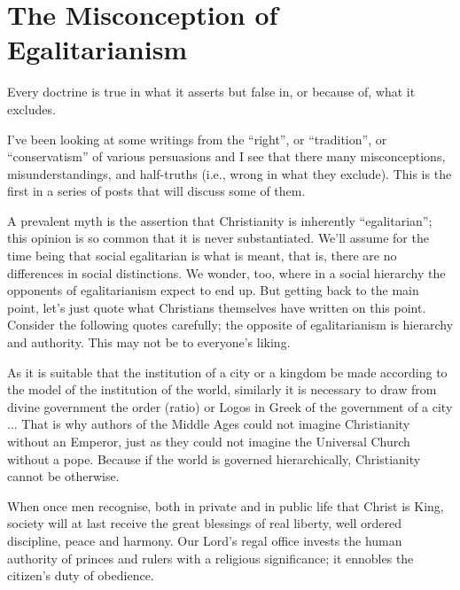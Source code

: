\section{The Misconception of Egalitarianism}

\begin{quotex}
Every doctrine is true in what it asserts but false in, or because of, what it excludes.
\end{quotex}


I've been looking at some writings from the ``right'', or ``tradition'', or ``conservatism'' of various persuasions and I see that there many misconceptions, misunderstandings, and half-truths (i.e., wrong in what they exclude). This is the first in a series of posts that will discuss some of them.

A prevalent myth is the assertion that Christianity is inherently ``egalitarian''; this opinion is so common that it is never substantiated. We'll assume for the time being that social egalitarian is what is meant, that is, there are no differences in social distinctions. We wonder, too, where in a social hierarchy the opponents of egalitarianism expect to end up. But getting back to the main point, let's just quote what Christians themselves have written on this point. Consider the following quotes carefully; the opposite of egalitarianism is hierarchy and authority. This may not be to everyone's liking.

\begin{quotex}
As it is suitable that the institution of a city or a kingdom be made according to the model of the institution of the world, similarly it is necessary to draw from divine government the order (ratio) or Logos in Greek of the government of a city ... That is why authors of the Middle Ages could not imagine Christianity without an Emperor, just as they could not imagine the Universal Church without a pope. Because if the world is governed hierarchically, Christianity cannot be otherwise.


\end{quotex}


\begin{quotex}
When once men recognise, both in private and in public life that Christ is King, society will at last receive the great blessings of real liberty, well ordered discipline, peace and harmony. Our Lord's regal office invests the human authority of princes and rulers with a religious significance; it ennobles the citizen's duty of obedience.


\end{quotex}


